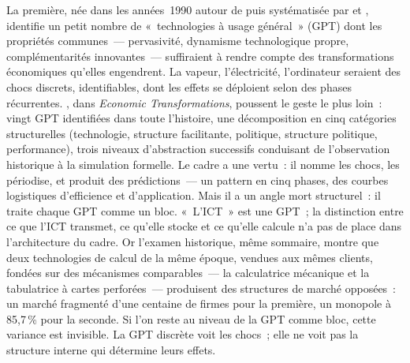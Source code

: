 La première, née dans les années~1990 autour de \textcite{bresnahan_general_1995} puis systématisée par \textcite{helpman_general_1998} et \textcite{lipsey_economic_2005}, identifie un petit nombre de «~technologies à usage général~» (GPT) dont les propriétés communes~--- pervasivité, dynamisme technologique propre, complémentarités innovantes~--- suffiraient à rendre compte des transformations économiques qu'elles engendrent. La vapeur, l'électricité, l'ordinateur seraient des chocs discrets, identifiables, dont les effets se déploient selon des phases récurrentes. \textcite{lipsey_economic_2005}, dans \emph{Economic Transformations}, poussent le geste le plus loin~: vingt GPT identifiées dans toute l'histoire, une décomposition en cinq catégories structurelles (technologie, structure facilitante, politique, structure politique, performance), trois niveaux d'abstraction successifs conduisant de l'observation historique à la simulation formelle. Le cadre a une vertu~: il nomme les chocs, les périodise, et produit des prédictions~--- un pattern en cinq phases, des courbes logistiques d'efficience et d'application. Mais il a un angle mort structurel~: il traite chaque GPT comme un bloc. «~L'ICT~» est une GPT~; la distinction entre ce que l'ICT transmet, ce qu'elle stocke et ce qu'elle calcule n'a pas de place dans l'architecture du cadre. Or l'examen historique, même sommaire, montre que deux technologies de calcul de la même époque, vendues aux mêmes clients, fondées sur des mécanismes comparables~--- la calculatrice mécanique et la tabulatrice à cartes perforées~--- produisent des structures de marché opposées~: un marché fragmenté d'une centaine de firmes pour la première, un monopole à 85,7\,\% pour la seconde. Si l'on reste au niveau de la GPT comme bloc, cette variance est invisible. La GPT discrète voit les chocs~; elle ne voit pas la structure interne qui détermine leurs effets.

